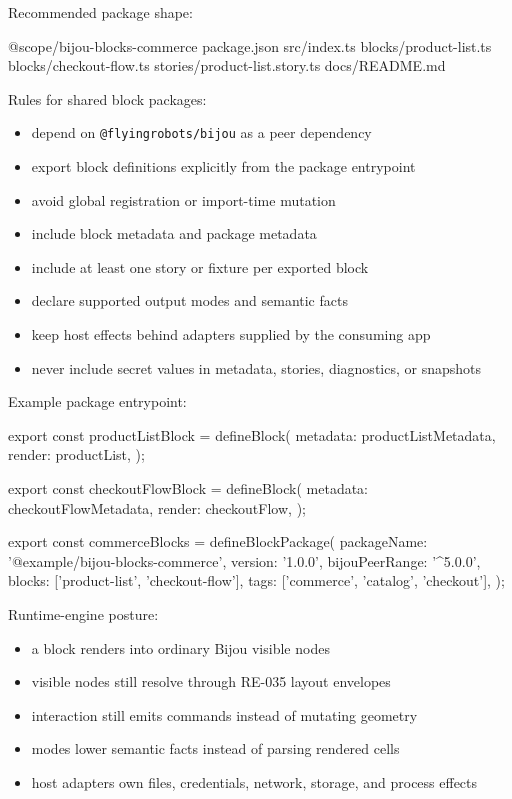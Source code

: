 Recommended package shape:

\begin{CodeBlock}
@scope/bijou-blocks-commerce
  package.json
  src/index.ts
  blocks/product-list.ts
  blocks/checkout-flow.ts
  stories/product-list.story.ts
  docs/README.md
\end{CodeBlock}

Rules for shared block packages:

\begin{itemize}
\tightlist
\item
  depend on \texttt{@\allowbreak{}f\allowbreak{}l\allowbreak{}y\allowbreak{}i\allowbreak{}n\allowbreak{}g\allowbreak{}r\allowbreak{}o\allowbreak{}b\allowbreak{}o\allowbreak{}t\allowbreak{}s\allowbreak{}/\allowbreak{}b\allowbreak{}i\allowbreak{}j\allowbreak{}o\allowbreak{}u} as a peer dependency
\item
  export block definitions explicitly from the package entrypoint
\item
  avoid global registration or import-time mutation
\item
  include block metadata and package metadata
\item
  include at least one story or fixture per exported block
\item
  declare supported output modes and semantic facts
\item
  keep host effects behind adapters supplied by the consuming app
\item
  never include secret values in metadata, stories, diagnostics, or snapshots
\end{itemize}

Example package entrypoint:

\begin{CodeBlock}
export const productListBlock = defineBlock({
  metadata: productListMetadata,
  render: productList,
});

export const checkoutFlowBlock = defineBlock({
  metadata: checkoutFlowMetadata,
  render: checkoutFlow,
});

export const commerceBlocks = defineBlockPackage({
  packageName: '@example/bijou-blocks-commerce',
  version: '1.0.0',
  bijouPeerRange: '^5.0.0',
  blocks: ['product-list', 'checkout-flow'],
  tags: ['commerce', 'catalog', 'checkout'],
});
\end{CodeBlock}

Runtime-engine posture:

\begin{itemize}
\tightlist
\item
  a block renders into ordinary Bijou visible nodes
\item
  visible nodes still resolve through RE-035 layout envelopes
\item
  interaction still emits commands instead of mutating geometry
\item
  modes lower semantic facts instead of parsing rendered cells
\item
  host adapters own files, credentials, network, storage, and process effects
\end{itemize}

